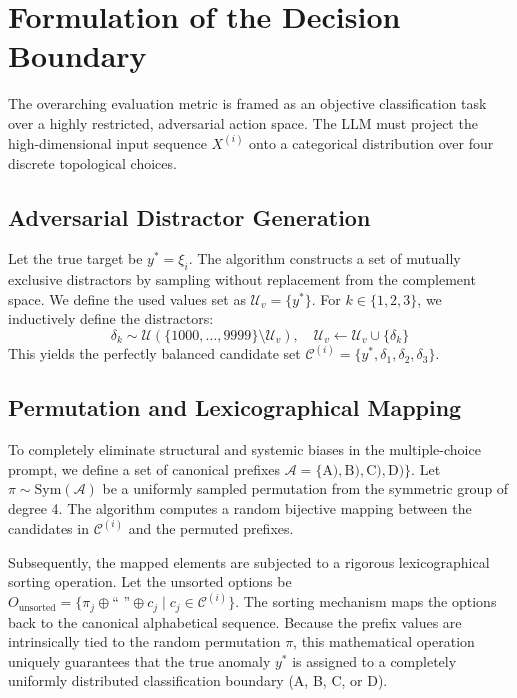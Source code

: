 \documentclass[11pt,a4paper]{article}
\newcommand{\U}{\mathcal{U}}
\begin{document}
\section{Formulation of the Decision Boundary}
The overarching evaluation metric is framed as an objective classification task over a highly restricted, adversarial action space. The LLM must project the high-dimensional input sequence $X^{(i)}$ onto a categorical distribution over four discrete topological choices.

\subsection{Adversarial Distractor Generation}
Let the true target be $y^* = \xi_i$. The algorithm constructs a set of mutually exclusive distractors by sampling without replacement from the complement space. We define the used values set as $\mathcal{U}_v = \{y^*\}$. For $k \in \{1, 2, 3\}$, we inductively define the distractors:
\begin{equation}
\delta_k \sim \U(\{1000, \dots, 9999\} \setminus \mathcal{U}_v), \quad \mathcal{U}_v \leftarrow \mathcal{U}_v \cup \{\delta_k\}
\end{equation}
This yields the perfectly balanced candidate set $\mathcal{C}^{(i)} = \{y^*, \delta_1, \delta_2, \delta_3\}$.

\subsection{Permutation and Lexicographical Mapping}
To completely eliminate structural and systemic biases in the multiple-choice prompt, we define a set of canonical prefixes $\mathcal{A} = \{\text{A)}, \text{B)}, \text{C)}, \text{D)}\}$. Let $\pi \sim \text{Sym}(\mathcal{A})$ be a uniformly sampled permutation from the symmetric group of degree 4. The algorithm computes a random bijective mapping between the candidates in $\mathcal{C}^{(i)}$ and the permuted prefixes. 

Subsequently, the mapped elements are subjected to a rigorous lexicographical sorting operation. Let the unsorted options be $O_{\text{unsorted}} = \{ \pi_j \oplus \text{`` ''} \oplus c_j \mid c_j \in \mathcal{C}^{(i)} \}$. The sorting mechanism maps the options back to the canonical alphabetical sequence. Because the prefix values are intrinsically tied to the random permutation $\pi$, this mathematical operation uniquely guarantees that the true anomaly $y^*$ is assigned to a completely uniformly distributed classification boundary (A, B, C, or D).
\end{document}
